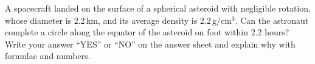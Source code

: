 A spacecraft landed on the surface of a spherical asteroid with negligible
rotation, whose diameter is 2.2\,km, and its average density is
2.2\,$\mathrm{g/cm^3}$. Can the astronaut complete a circle along the equator
of the asteroid on foot within 2.2 hours? Write your answer ``YES'' or ``NO''
on the answer sheet and explain why with formulae and numbers.
